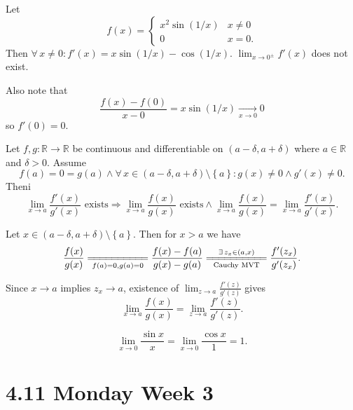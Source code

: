 \documentclass{notes}
\begin{document}
\begin{eg}
  Let 
  \[
    f(x) = \begin{cases}
      x^2 \sin(1 / x) & x \neq 0 \\ 
      0 & x = 0.
    \end{cases}
  \]
  Then $\forall \, x \neq 0: f'(x) = x \sin(1 / x) - \cos(1 / x)$.
  $\lim_{x \to 0^\pm} f'(x)$ does not exist.

  Also note that 
  \[
    \frac{f(x) - f(0)}{x - 0} = x \sin(1 / x) \underset{x \to 0}{\longrightarrow} 0
  \]
  so $f'(0) = 0$.
\end{eg}

\begin{thm}
  Let $f, g \colon \mathbb R \to \mathbb R$ be continuous and differentiable on $(a - \delta, a + \delta)$ where $a \in \mathbb R$ and $\delta > 0$.
  Assume 
  \[
    f(a) = 0 = g(a) \land \forall \, x \in (a - \delta, a + \delta) \setminus \left \{ a \right \}: g(x) \neq 0 \land g'(x) \neq 0.
  \]
  Theni
  \[
    \lim_{x \to a} \frac{f'(x)}{g'(x)} \text{ exists} \Rightarrow \lim_{x \to a} \frac{f(x)}{g(x)} \text{ exists} \land \lim_{x \to a} \frac{f(x)}{g(x)} = \lim_{x \to a} \frac{f'(x)}{g'(x)}.
  \]
\end{thm}

\begin{prf}
  Let $x \in (a - \delta, a + \delta) \setminus \left \{ a \right \}$.
  Then for $x > a$ we have 
  \[
    \frac{f(x)}{g(x)} \underset{f(a) = 0, g(a) = 0}{=\joinrel=\joinrel=\joinrel=\joinrel=\joinrel=\joinrel=\joinrel=\joinrel=\joinrel=} \frac{f(x) - f(a)}{g(x) - g(a)} \overset{\exists \, z_x \in (a, x)}{\underset{\text{Cauchy MVT}}{=\joinrel=\joinrel=\joinrel=\joinrel=\joinrel=\joinrel=\joinrel=\joinrel=\joinrel=}} \frac{f'(z_x)}{g'(z_x)}.
  \]
  
  Since $x \to a$ implies $z_x \to a$, existence of $\lim_{z \to a} \frac{f'(z)}{g'(z)}$ gives 
  \[
    \lim_{x \to a} \frac{f(x)}{g(x)} = \lim_{z \to a} \frac{f'(z)}{g'(z)}.
  \]
\end{prf}

\begin{eg}
  \[
    \lim_{x \to 0} \frac{\sin x}{x} = \lim_{x \to 0} \frac{\cos x}{1} = 1.
  \]
\end{eg}

\newpage

\section{4.11 Monday Week 3}
\end{document}
